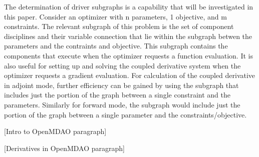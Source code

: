 \documentclass[]{aiaa-tc} %
\begin{document}
    The determination of driver subgraphs is a capability that will be investigated in this paper.
    Consider an optimizer with n parameters, 1 objective, and m constraints. The relevant 
    subgraph of this problem is the set of component disciplines and their variable connection that
    lie within the subgraph betwen the parameters and the contraints and objective. This subgraph
    contains the components that execute when the optimizer requests a function evaluation. It is
    also useful for setting up and solving the coupled derivative system when the optimizer requests
    a gradient evaluation. For calculation of the coupled derivative in adjoint mode, further
    efficiency can be gained by using the subgraph that includes just the portion of the graph 
    between a single constraint and the parameters. Similarly for forward mode, the subgraph would
    include just the portion of the graph between a single parameter and the constraints/objective.

    [Intro to OpenMDAO paragraph]

    [Derivatives in OpenMDAO paragraph]
 
  
\end{document}
